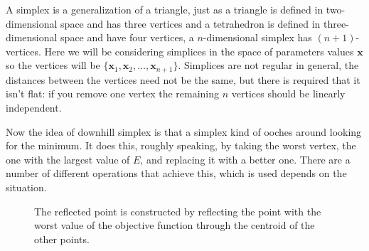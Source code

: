 \documentclass[11pt,a4paper]{scrartcl}
\begin{document}
A simplex is a generalization of a triangle, just as a triangle is
defined in two-dimensional space and has three vertices and a
tetrahedron is defined in three-dimensional space and have four
vertices, a $n$-dimensional simplex has $(n+1)$-vertices. Here we will
be considering simplices in the space of parameters values
$\mathbf{x}$ so the vertices will be
$\{\mathbf{x}_1,\mathbf{x}_2,\ldots,\mathbf{x}_{n+1}\}$. Simplices are
not regular in general, the distances between the vertices need not be
the same, but there is required that it isn't flat: if you remove one
vertex the remaining $n$ vertices should be linearly independent.

Now the idea of downhill simplex is that a simplex kind of ooches
around looking for the minimum. It does this, roughly speaking, by
taking the worst vertex, the one with the largest value of $E$, and
replacing it with a better one. There are a number of different
operations that achieve this, which is used depends on the 
situation.

\begin{figure}
\begin{center}

\end{center}
\caption{The reflected point is constructed by reflecting the point
  with the worst value of the objective function through the centroid
  of the other points.\label{fig:reflection}}
\end{figure}
\end{document}
